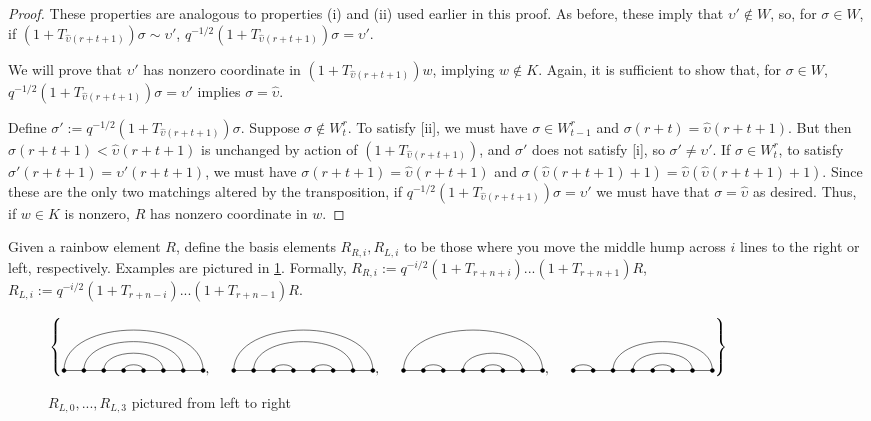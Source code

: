 \documentclass{amsart}
\begin{document}
\begin{proof}
	These properties are analogous to properties (i) and (ii) used earlier in this proof. As before, these imply that $\upsilon'\not\in W$, so, for $\sigma\in W$, if $(1+T_{\widehat{\upsilon}(r+t+1)})\sigma\sim \upsilon'$, $q^{-1/2}(1+T_{\widehat{\upsilon}(r+t+1)})\sigma=\upsilon'$.
	
	We will prove that $\upsilon'$ has nonzero coordinate in $(1+T_{\widehat{\upsilon}(r+t+1)})w$, implying $w\not\in K$. Again, it is sufficient to show that, for $\sigma\in W$, $q^{-1/2}(1+T_{\widehat{\upsilon}(r+t+1)})\sigma=\upsilon'$ implies $\sigma=\widehat{\upsilon}$.
	
	Define $\sigma':=q^{-1/2}(1+T_{\widehat{\upsilon}(r+t+1)})\sigma$. Suppose $\sigma\not\in W^r_t$. To satisfy [ii], we must have $\sigma\in W^r_{t-1}$ and $\sigma(r+t)=\widehat{\upsilon}(r+t+1)$. But then $\sigma(r+t+1)<\widehat{\upsilon}(r+t+1)$ is unchanged by action of $(1+T_{\widehat{\upsilon}(r+t+1)})$, and $\sigma'$ does not satisfy [i], so $\sigma'\not=\upsilon'$. If $\sigma\in W^r_t$, to satisfy $\sigma'(r+t+1)=\upsilon'(r+t+1)$, we must have $\sigma(r+t+1)=\widehat{\upsilon}(r+t+1)$ and $\sigma(\widehat{\upsilon}(r+t+1)+1)=\widehat{\upsilon}(\widehat{\upsilon}(r+t+1)+1)$. Since these are the only two matchings altered by the transposition, if $q^{-1/2}(1+T_{\widehat{\upsilon}(r+t+1)})\sigma=\upsilon'$ we must have that $\sigma=\widehat{\upsilon}$ as desired. Thus, if $w\in K$ is nonzero, $R$ has nonzero coordinate in $w$.
\end{proof}

Given a rainbow element $R$, define the basis elements $R_{R,i},R_{L,i}$ to be those where you move the middle hump across $i$ lines to the right or left, respectively. Examples are pictured in \ref{shifted rainbow}. Formally, $R_{R,i}:=q^{-i/2}(1+T_{r+n+i})...(1+T_{r+n+1})R$, $R_{L,i}:=q^{-i/2}(1+T_{r+n-i})...(1+T_{r+n-1})R$.

\begin{figure}
	\def\cbasisspacing{5mm}
	$\cbr{
		\begin{gathered}
		\Matching{8}{1/8, 2/7, 3/6, 4/5}, \hspace{\cbasisspacing}
		\Matching{8}{1/8, 2/7, 3/4, 5/6}, \hspace{\cbasisspacing}
		\Matching{8}{1/8, 2/3, 4/7, 5/6}, \hspace{\cbasisspacing}
		\Matching{8}{1/2,3/8,4/7,5/6}
		\end{gathered}}$
	\caption{$R_{L,0},...,R_{L,3}$ pictured from left to right}
	\label{shifted rainbow}
\end{figure}
\end{document}

